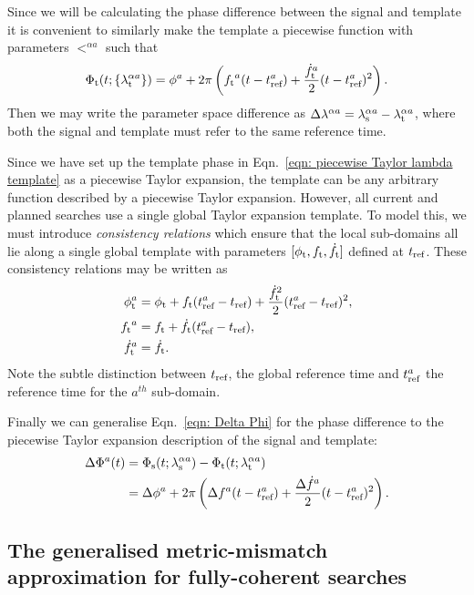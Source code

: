 \documentclass[../full_thesis/full_thesis.tex]{subfiles}
\begin{document}
Since we will be calculating the phase difference between the signal and template
it is convenient to similarly make the template a piecewise function with
parameters $\lt^{\alpha a}$ such that
\begin{align}
\Phi_{\textrm{t}}(t; \{{\lambda}_\textrm{t}^{\alpha a}\}) = \phi^a + 2\pi \left({f_{\textrm{t}}}^a (t - t_{\textrm{ref}}^a)
+ \frac{\dot{f}_{\textrm{t}}^a}{2}(t - t_{\textrm{ref}}^a)^{2} \right).
\label{eqn: piecewise Taylor lambda template}
\end{align}
Then we may write the parameter space difference as
$\Delta\lambda^{\alpha a} = {\lambda}_\textrm{s}^{\alpha a} - {\lambda}_\textrm{t}^{\alpha a}$, where both the signal and
template must refer to the same reference time.

Since we have set up the template phase in Eqn.~\eqref{eqn: piecewise Taylor
lambda template} as a piecewise Taylor expansion, the template can
be any arbitrary function described by a piecewise Taylor expansion. However,
all current and planned searches use a single global Taylor expansion template.
To model this, we must introduce \emph{consistency relations}
which ensure that the local sub-domains all lie along a single global template
with parameters $[\phi_{\textrm{t}}, {f_{\textrm{t}}}, \dot{f}_{\textrm{t}}]$ defined at $t_{\textrm{ref}}$. These consistency
relations may be written as
\begin{align}
\begin{split}
\phi_{\textrm{t}}^a & = \phi_{\textrm{t}} + {f_{\textrm{t}}}(t_{\textrm{ref}}^a - t_{\textrm{ref}}) + \frac{\dot{f}_{\textrm{t}}^{2}}{2}(t_{\textrm{ref}}^a - t_{\textrm{ref}})^{2}, \\
{f_{\textrm{t}}}^a & = {f_{\textrm{t}}} + \dot{f}_{\textrm{t}}(t_{\textrm{ref}}^a - t_{\textrm{ref}}), \\
\dot{f}_{\textrm{t}}^a & = \dot{f}_{\textrm{t}}.
\end{split}
\end{align}
Note the subtle distinction between $t_{\textrm{ref}}$, the global reference time and
$t_{\textrm{ref}}^{a}$ the reference time for the $a^{th}$ sub-domain.

Finally we can generalise Eqn.~\eqref{eqn: Delta Phi} for the phase difference
to the piecewise Taylor expansion description of the signal and template:
\begin{align}
\begin{split}
\Delta\Phi^{a}(t)& =  \Phi_{\textrm{s}}(t; {\lambda}_\textrm{s}^{\alpha a}) - \Phi_{\textrm{t}}(t; {\lambda}_\textrm{t}^{\alpha a})\\
& = \Delta\phi^{a} + 2\pi\left(\Delta f^{a}(t-t_{\textrm{ref}}^{a})
+ \frac{\Delta\dot{f}^{a}}{2}(t - t_{\textrm{ref}}^{a})^{2}\right).
\end{split}
\end{align}

\subsection{The generalised metric-mismatch approximation for fully-coherent
            searches}
\end{document}
